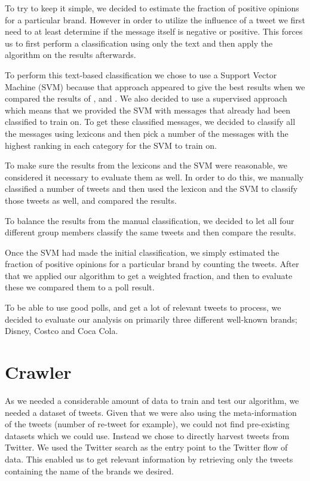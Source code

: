 \documentclass[a4paper,12pt]{report}
\begin{document}
To try to keep it simple, we decided to estimate the fraction of positive opinions for a particular brand.
However in order to utilize the influence of a tweet we first need to at least determine if the message itself is negative or positive.
This forces us to first perform a classification using only the text and then apply the algorithm on the results afterwards.

To perform this text-based classification we chose to use a Support Vector Machine (SVM) because that approach appeared to give the best results when we compared the results of \cite{Pang02}, \cite{Turney02} and \cite{Taboada10}.
We also decided to use a supervised approach which means that we provided the SVM with messages that already had been classified to train on.
To get these classified messages, we decided to classify all the messages using lexicons and then pick a number of the messages with the highest ranking in each category for the SVM to train on.

To make sure the results from the lexicons and the SVM were reasonable, we considered it necessary to evaluate them as well. 
In order to do this, we manually classified a number of tweets and then used the lexicon and the SVM to classify those tweets as well, and compared the results.

To balance the results from the manual classification, we decided to let all four different group members classify the same tweets and then compare the results.

Once the SVM had made the initial classification, we simply estimated the fraction of positive opinions for a particular brand by counting the tweets. After that we applied our algorithm to get a weighted fraction, and then to evaluate these we compared them to a poll result.

To be able to use good polls, and get a lot of relevant tweets to process, we decided to evaluate our analysis on primarily three different well-known brands; Disney, Costco and Coca Cola.

\section{Crawler}

As we needed a considerable amount of data to train and test our algorithm, we needed a dataset of tweets. 
Given that we were also using the meta-information of the tweets (number of re-tweet for example), we could not find pre-existing datasets which we could use.
Instead we chose to directly harvest tweets from Twitter.
We used the Twitter search as the entry point to the Twitter flow of data. 
This enabled us to get relevant information by retrieving only the tweets containing the name of the brands we desired.
\end{document}
